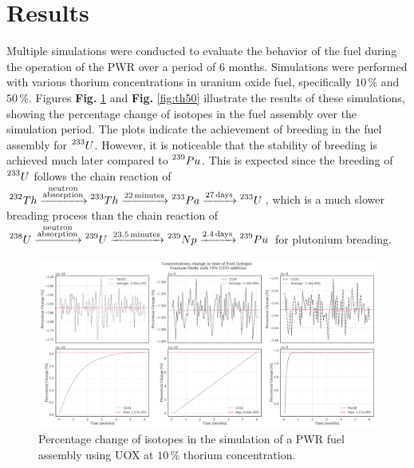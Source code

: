 \section{Results}
Multiple simulations were conducted to evaluate the behavior of the fuel during the operation of the PWR over a period of 6 months. Simulations were performed with various thorium concentrations in uranium oxide fuel, specifically \(10 \, \%\) and \(50 \, \%\). Figures \textbf{Fig.} \ref{fig:th10} and \textbf{Fig.} \ref{fig:th50} illustrate the results of these simulations, showing the percentage change of isotopes in the fuel assembly over the simulation period. The plots indicate the achievement of breeding in the fuel assembly for \(\prescript{233}{}{U}\). However, it is noticeable that the stability of breeding is achieved much later compared to \(\prescript{239}{}{Pu}\). This is expected since the breeding of \(\prescript{233}{}{U}\) follows the chain reaction of \(\prescript{232}{}{Th} \xrightarrow{\substack{\text{neutron} \\ \text{absorption}}} \prescript{233}{}{Th} \xrightarrow{22 \, \text{minutes}} \prescript{233}{}{Pa} \xrightarrow{27 \, \text{days}} \prescript{233}{}{U}\), which is a much slower breading process than the chain reaction of \(\prescript{238}{}{U} \xrightarrow{\substack{\text{neutron} \\ \text{absorption}}} \prescript{239}{}{U} \xrightarrow{23.5 \, \text{minutes}} \prescript{239}{}{Np} \xrightarrow{2.4 \, \text{days}} \prescript{239}{}{Pu}\) for plutonium breading.

\begin{figure}[ht]
    \centering
    \includegraphics[width=1\textwidth]{Kap7/Figures_Kap7/percentual_change_th232_con_10.pdf}
    \caption{Percentage change of isotopes in the simulation of a PWR fuel assembly using UOX at \(10 \, \%\) thorium concentration.}
    \label{fig:th10}
\end{figure}

